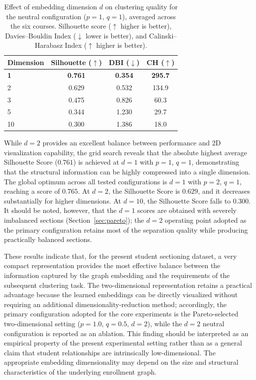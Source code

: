\documentclass[pdflatex,sn-mathphys-num,iicol]{sn-jnl}%
\theoremstyle{thmstyleone}%
\theoremstyle{thmstyletwo}%
\theoremstyle{thmstylethree}%
\begin{document}
\begin{table}[t]
\centering
\caption{Effect of embedding dimension $d$ on clustering quality for the neutral configuration ($p{=}1$, $q{=}1$), averaged across the six courses. Silhouette score ($\uparrow$ higher is better), Davies--Bouldin Index ($\downarrow$ lower is better), and Calinski--Harabasz Index ($\uparrow$ higher is better).}
\label{tab:ablation_dimension}
\begin{tabular}{lccc}
\toprule
\textbf{Dimension} & \textbf{Silhouette ($\uparrow$)} & \textbf{DBI ($\downarrow$)} & \textbf{CH ($\uparrow$)} \\
\midrule
\textbf{1} & \textbf{0.761} & \textbf{0.354} & \textbf{295.7} \\
2 & 0.629 & 0.532 & 134.9 \\
3 & 0.475 & 0.826 & 60.3 \\
5 & 0.344 & 1.230 & 29.7 \\
10 & 0.300 & 1.386 & 18.0 \\
\bottomrule
\end{tabular}
\end{table}

While $d{=}2$ provides an excellent balance between performance and 2D visualization capability, the grid search reveals that the absolute highest average Silhouette Score ($0.761$) is achieved at $d{=}1$ with $p{=}1$, $q{=}1$, demonstrating that the structural information can be highly compressed into a single dimension. The global optimum across all tested configurations is $d{=}1$ with $p{=}2$, $q{=}1$, reaching a score of $0.765$. At $d{=}2$, the Silhouette Score is $0.629$, and it decreases substantially for higher dimensions. At $d{=}10$, the Silhouette Score falls to $0.300$. It should be noted, however, that the $d{=}1$ scores are obtained with severely imbalanced sections (Section~\ref{sec:pareto}); the $d{=}2$ operating point adopted as the primary configuration retains most of the separation quality while producing practically balanced sections.

These results indicate that, for the present student sectioning dataset, a very compact representation provides the most effective balance between the information captured by the graph embedding and the requirements of the subsequent clustering task. The two-dimensional representation retains a practical advantage because the learned embeddings can be directly visualized without requiring an additional dimensionality-reduction method; accordingly, the primary configuration adopted for the core experiments is the Pareto-selected two-dimensional setting ($p=1.0$, $q=0.5$, $d=2$), while the $d=2$ neutral configuration is reported as an ablation. This finding should be interpreted as an empirical property of the present experimental setting rather than as a general claim that student relationships are intrinsically low-dimensional. The appropriate embedding dimensionality may depend on the size and structural characteristics of the underlying enrollment graph.
\end{document}

